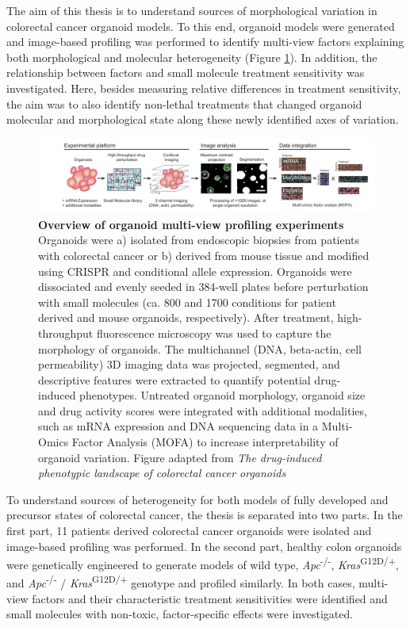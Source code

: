 \begin{flushleft}
The aim of this thesis is to understand sources of morphological variation in colorectal cancer organoid models. To this end, organoid models were generated and image-based profiling was performed to identify multi-view factors explaining both morphological and molecular heterogeneity (Figure \ref{fig_130}). In addition, the relationship between factors and small molecule treatment sensitivity was investigated. Here, besides measuring relative differences in treatment sensitivity, the aim was to also identify non-lethal treatments that changed organoid molecular and morphological state along these newly identified axes of variation.
\bigbreak

\begin{figure}[h]
\centering
\includegraphics[width=\textwidth,
                height=\textheight,
                keepaspectratio]{figures/promise/pdf/fig_1_1_1.pdf}
\caption[Overview of organoid multi-view profiling experiments]{\textbf{Overview of organoid multi-view profiling experiments} Organoids were a) isolated from endoscopic biopsies from patients with colorectal cancer or b) derived from mouse tissue and modified using CRISPR and conditional allele expression. Organoids were dissociated and evenly seeded in 384-well plates before perturbation with small molecules (ca. 800 and 1700 conditions for patient derived and mouse organoids, respectively). After treatment, high-throughput fluorescence microscopy was used to capture the morphology of organoids.  The multichannel (DNA, beta-actin, cell permeability) 3D imaging data was projected, segmented, and descriptive features were extracted to quantify potential drug-induced phenotypes. Untreated organoid morphology, organoid size and drug activity scores were integrated with additional modalities, such as mRNA expression and DNA sequencing data in a Multi-Omics Factor Analysis (MOFA) to increase interpretability of organoid variation. Figure adapted from \textit{The drug-induced phenotypic landscape of colorectal cancer organoids} \parencite{betgeDruginducedPhenotypicLandscape2022}}
\label{fig_130}
\end{figure}

To understand sources of heterogeneity for both models of fully developed and precursor states of colorectal cancer, the thesis is separated into two parts. In the first part, 11 patients derived colorectal cancer organoids were isolated and image-based profiling was performed. In the second part, healthy colon organoids were genetically engineered to generate models of wild type, \textit{Apc}\textsuperscript{-/-}, \textit{Kras}\textsuperscript{G12D/+}, and \textit{Apc}\textsuperscript{-/-} / \textit{Kras}\textsuperscript{G12D/+} genotype and profiled similarly. In both cases, multi-view factors and their characteristic treatment sensitivities were identified and small molecules with non-toxic, factor-specific effects were investigated.


\end{flushleft}
